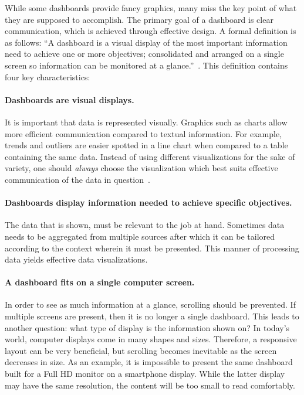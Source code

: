         While some dashboards provide fancy graphics, many miss the key point of what they are supposed to accomplish. The primary goal of a dashboard is clear communication, which is achieved through effective design. A formal definition is as follows: ``A dashboard is a visual display of the most important information need to achieve one or more objectives; consolidated and arranged on a single screen so information can be monitored at a glance.''~\cite{Few2006}. This definition contains four key characteristics:

        \paragraph{Dashboards are visual displays.} It is important that data is represented visually. Graphics such as charts allow more efficient communication compared to textual information. For example, trends and outliers are easier spotted in a line chart when compared to a table containing the same data. Instead of using different visualizations for the sake of variety, one should \emph{always} choose the visualization which best suits effective communication of the data in question~\cite{Few2005}.

        \paragraph{Dashboards display information needed to achieve specific objectives.} The data that is shown, must be relevant to the job at hand. Sometimes data needs to be aggregated from multiple sources after which it can be tailored according to the context wherein it must be presented. This manner of processing data yields effective data visualizations.

        \paragraph{A dashboard fits on a single computer screen.} In order to see as much information at a glance, scrolling should be prevented. If multiple screens are present, then it is no longer a single dashboard. This leads to another question: what type of display is the information shown on? In today's world, computer displays come in many shapes and sizes. Therefore, a responsive layout can be very beneficial, but scrolling becomes inevitable as the screen decreases in size. As an example, it is impossible to present the same dashboard built for a Full HD monitor on a smartphone display. While the latter display may have the same resolution, the content will be too small to read comfortably.

